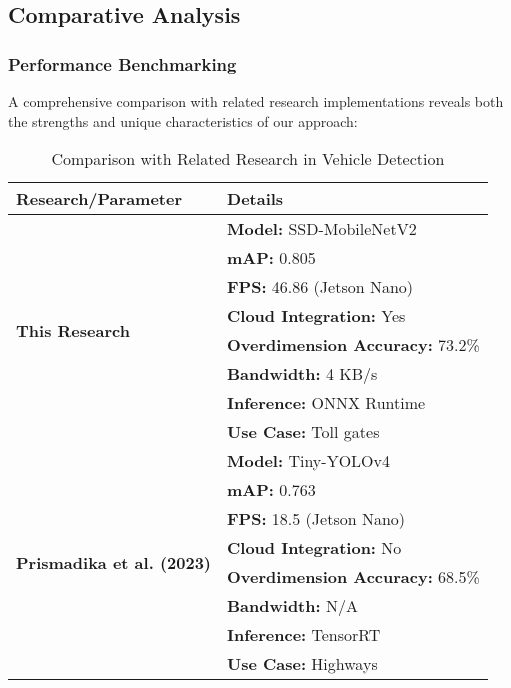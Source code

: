 \subsection{Comparative Analysis}

\subsubsection{Performance Benchmarking}
A comprehensive comparison with related research implementations reveals both the strengths and unique characteristics of our approach:

\begin{table}[htbp]
  \centering
  \caption{Comparison with Related Research in Vehicle Detection}
  \label{tab:research_comparison}
  \setlength{\tabcolsep}{4pt}
  \footnotesize
  \begin{tabular}{|l|l|}
    \hline
    \rowcolor[HTML]{C0C0C0}
    \textbf{Research/Parameter} & \textbf{Details} \\
    \hline
    \multirow{8}{*}{\textbf{This Research}} & \textbf{Model:} SSD-MobileNetV2 \\
    \cline{2-2}
    & \textbf{mAP:} 0.805 \\
    \cline{2-2}
    & \textbf{FPS:} 46.86 (Jetson Nano) \\
    \cline{2-2}
    & \textbf{Cloud Integration:} Yes \\
    \cline{2-2}
    & \textbf{Overdimension Accuracy:} 73.2\% \\
    \cline{2-2}
    & \textbf{Bandwidth:} 4 KB/s \\
    \cline{2-2}
    & \textbf{Inference:} ONNX Runtime \\
    \cline{2-2}
    & \textbf{Use Case:} Toll gates \\
    \hline
    \multirow{8}{*}{\textbf{Prismadika et al. (2023) \cite{prismadika2023}}} & \textbf{Model:} Tiny-YOLOv4 \\
    \cline{2-2}
    & \textbf{mAP:} 0.763 \\
    \cline{2-2}
    & \textbf{FPS:} 18.5 (Jetson Nano) \\
    \cline{2-2}
    & \textbf{Cloud Integration:} No \\
    \cline{2-2}
    & \textbf{Overdimension Accuracy:} 68.5\% \\
    \cline{2-2}
    & \textbf{Bandwidth:} N/A \\
    \cline{2-2}
    & \textbf{Inference:} TensorRT \\
    \cline{2-2}
    & \textbf{Use Case:} Highways \\

\end{tabular}
\end{table}
